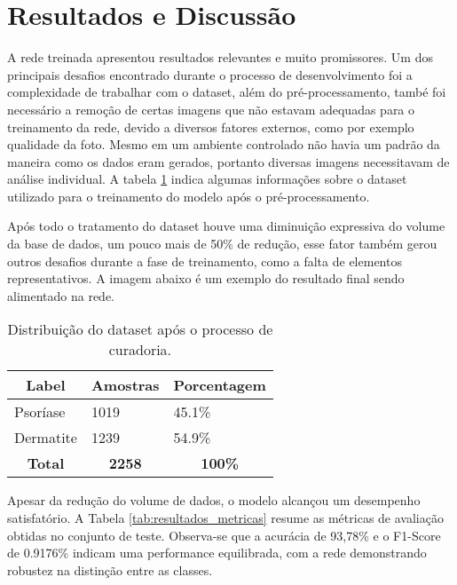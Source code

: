 \section{Resultados e Discussão}

A rede treinada apresentou resultados relevantes e muito promissores. Um dos principais desafios encontrado durante o processo de desenvolvimento foi a complexidade de trabalhar com o dataset, além do pré-processamento, també foi necessário a remoção de certas imagens que não estavam adequadas para o treinamento da rede, devido a diversos fatores externos, como por exemplo qualidade da foto. Mesmo em um ambiente controlado não havia um padrão da maneira como os dados eram gerados, portanto diversas imagens necessitavam de análise individual. A tabela \ref{tab:db-table} indica algumas informações sobre o dataset utilizado para o treinamento do modelo após o pré-processamento. 

Após todo o tratamento do dataset houve uma diminuição expressiva do volume da base de dados, um pouco mais de 50\% de redução, esse fator também gerou outros desafios durante a fase de treinamento, como a falta de elementos representativos. A imagem abaixo é um exemplo do resultado final sendo alimentado na rede.

\newline
\begin{table}[h]
  \centering
  \label{tab:db-table}
  \begin{tabular}{|l|l|l|}
  \hline
  \multicolumn{1}{|c|}{\textbf{Label}} & \multicolumn{1}{c|}{\textbf{Amostras}} & \multicolumn{1}{c|}{\textbf{Porcentagem}} \\ \hline
  Psoríase                             & 1019                                   & 45.1\%                                  \\ \hline
  Dermatite                            & 1239                                   & 54.9\%                                  \\ \hline
  \multicolumn{1}{|c|}{\textbf{Total}} & \multicolumn{1}{c|}{\textbf{2258}}     & \multicolumn{1}{c|}{\textbf{100\%}}     \\ \hline
  \end{tabular}
  \caption{Distribuição do dataset após o processo de curadoria.}
\end{table}

Apesar da redução do volume de dados, o modelo alcançou um desempenho satisfatório. A Tabela \ref{tab:resultados_metricas} resume as métricas de avaliação obtidas no conjunto de teste. Observa-se que a acurácia de 93,78\% e o F1-Score de 0.9176\% indicam uma performance equilibrada, com a rede demonstrando robustez na distinção entre as classes.

